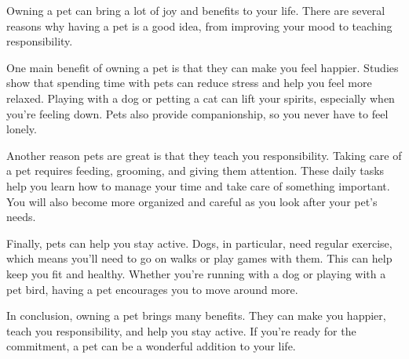 \documentclass[12pt]{article}
\begin{document}
\begin{tcolorbox}[colframe=black!60, colback=white, 
coltitle=black, colbacktitle=black!15, fonttitle=\bfseries\Large, 
title=Text: Pet Ownership, halign title=center, left=10pt, right=10pt, top=10pt, bottom=15pt]
Owning a pet can bring a lot of joy and benefits to your life. There are several reasons why having a pet is a good idea, from improving your mood to teaching responsibility.

One main benefit of owning a pet is that they can make you feel happier. Studies show that spending time with pets can reduce stress and help you feel more relaxed. Playing with a dog or petting a cat can lift your spirits, especially when you’re feeling down. Pets also provide companionship, so you never have to feel lonely.

Another reason pets are great is that they teach you responsibility. Taking care of a pet requires feeding, grooming, and giving them attention. These daily tasks help you learn how to manage your time and take care of something important. You will also become more organized and careful as you look after your pet’s needs.

Finally, pets can help you stay active. Dogs, in particular, need regular exercise, which means you’ll need to go on walks or play games with them. This can help keep you fit and healthy. Whether you’re running with a dog or playing with a pet bird, having a pet encourages you to move around more.

In conclusion, owning a pet brings many benefits. They can make you happier, teach you responsibility, and help you stay active. If you’re ready for the commitment, a pet can be a wonderful addition to your life.

 
\end{tcolorbox}
\end{document}
